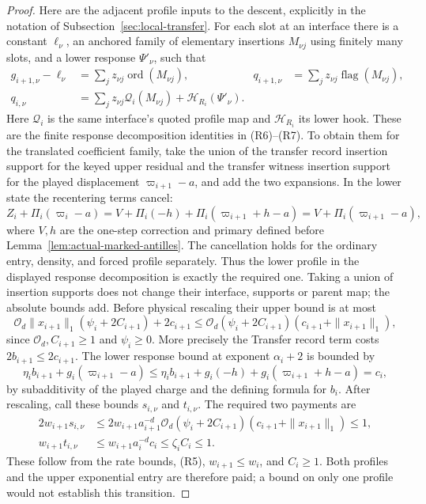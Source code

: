 \begin{proof}
Here are the adjacent profile inputs to the descent, explicitly in the
notation of Subsection~\ref{sec:local-transfer}. For each slot at an interface
there is a constant $\ell_\nu$, an anchored family of elementary
insertions $M_{\nu j}$ using finitely many slots, and a lower response
$\Psi'_{\nu}$, such that
\[
 \begin{aligned}
 g_{i+1,\nu}-\ell_\nu&=\sum_j z_{\nu j}\operatorname{ord}(M_{\nu j}),&
 q_{i+1,\nu}&=\sum_j z_{\nu j}\operatorname{flag}(M_{\nu j}),\\
 q_{i,\nu}&=\sum_j z_{\nu j}\mathcal Q_i(M_{\nu j})
                         +\mathcal H_{R_i}(\Psi'_\nu).
 \end{aligned}
\]
Here $\mathcal Q_i$ is the same interface's quoted profile map and
$\mathcal H_{R_i}$ its lower hook. These are the finite response decomposition identities
in (R6)--(R7). To obtain them for the translated coefficient family, take the union
of the transfer record insertion support for the keyed upper residual and the transfer witness insertion support
for the played displacement $\varpi_{i+1}-a$, and add the two expansions.
In the lower state the recentering terms cancel:
\[
 Z_i+\Pi_i(\varpi_i-a)
   =V+\Pi_i(-h)+\Pi_i(\varpi_{i+1}+h-a)
   =V+\Pi_i(\varpi_{i+1}-a),
\]
where $V,h$ are the one-step correction and primary defined before
Lemma~\ref{lem:actual-marked-antilles}. The cancellation holds for the
ordinary entry, density, and forced profile separately. Thus the lower
profile in the displayed response decomposition is exactly the required one. Taking a
union of insertion supports does not change their interface, supports or parent map;
the absolute bounds add. Before physical rescaling their upper bound
is at most
\[
 \mathcal O_d\|x_{i+1}\|_1(\psi_i+2C_{i+1})+2c_{i+1}
 \le\mathcal O_d(\psi_i+2C_{i+1})(c_{i+1}+\|x_{i+1}\|_1),
\]
since $\mathcal O_d,C_{i+1}\ge1$ and $\psi_i\ge0$. More precisely the
Transfer record term costs $2b_{i+1}\le2c_{i+1}$. The lower response bound at
exponent $\alpha_i+2$ is bounded by
\[
 \eta_i b_{i+1}+g_i(\varpi_{i+1}-a)
 \le\eta_i b_{i+1}+g_i(-h)+g_i(\varpi_{i+1}+h-a)=c_i,
\]
by subadditivity of the played charge and the defining formula for $b_i$.
After rescaling, call
these bounds $s_{i,\nu}$ and $t_{i,\nu}$. The required two payments are
\[
 \begin{split}
 2w_{i+1}s_{i,\nu}
 &\le2w_{i+1}a_{i+1}^{-d}\mathcal O_d(\psi_i+2C_{i+1})
             (c_{i+1}+\|x_{i+1}\|_1)\le1,\\
 w_{i+1}t_{i,\nu}&\le w_{i+1}a_i^{-d}c_i
                  \le\zeta_i C_i\le1.
 \end{split}
\]
These follow from the rate bounds, (R5), $w_{i+1}\le w_i$, and
$C_i\ge1$. Both profiles and the upper exponential entry are therefore
paid; a bound on only one profile would not establish this transition.


\end{proof}
